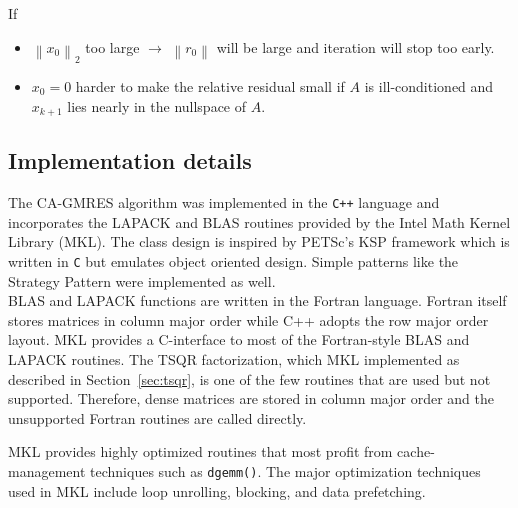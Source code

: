 \documentclass{scrartcl}
\numberwithin{equation}{section}
\newcommand{\norm}[1]{\left\lVert#1\right\rVert}
\begin{document}
If
\begin{itemize}
\item $\norm{x_0}_2$ too large $\rightarrow$ $\norm{r_0}$ will be large and iteration will stop too early.
\item $x_0 = 0$ harder to make the relative residual small if $A$ is ill-conditioned and $x_{k+1}$ lies nearly in the nullspace of $A$.
\end{itemize}
\subsection{Implementation details}
The CA-GMRES algorithm was implemented in the \texttt{C++} language and incorporates the LAPACK and BLAS routines provided by the Intel Math Kernel Library (MKL). The class design is inspired by PETSc's KSP framework which is written in \texttt{C} but emulates object oriented design. Simple patterns like the Strategy Pattern were implemented as well.\\
BLAS and LAPACK functions are written in the Fortran language. Fortran itself stores matrices in column major order while C++ adopts the row major order layout. MKL provides a C-interface to most of the Fortran-style BLAS and LAPACK routines. The TSQR factorization, which MKL implemented as described in Section~\ref{sec:tsqr}, is one of the few routines that are used but not supported. Therefore, dense matrices are stored in column major order and the unsupported Fortran routines are called directly.

MKL provides highly optimized routines that most profit from cache-management techniques such as \texttt{dgemm()}.
The major optimization techniques used in MKL include loop unrolling, blocking, and data prefetching.
\end{document}
